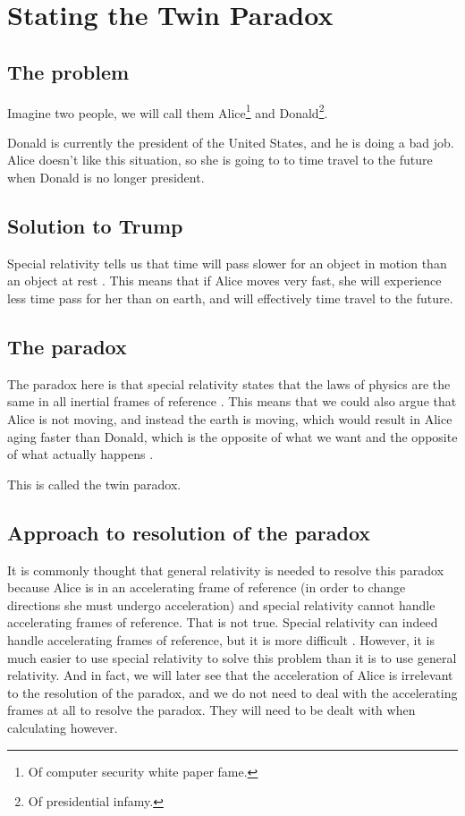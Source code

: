\chapter{Stating the Twin Paradox}
	\section{The problem}
		Imagine two people, we will call them Alice\footnote{Of computer security white paper fame.} and Donald\footnote{Of presidential infamy.}.

		Donald is currently the president of the United States, and he is doing a bad job.
		Alice doesn't like this situation, so she is going to to time travel to the future when Donald is no longer president.
	\section{Solution to Trump}
		Special relativity tells us that time will pass slower for an object in motion than an object at rest \autocites{textbook}{einstein1916}.
		This means that if Alice moves very fast, she will experience less time pass for her than on earth, and will effectively time travel to the future.
	\section{The paradox}
		The paradox here is that special relativity states that the laws of physics are the same in all inertial frames of reference \autocites{textbook}{einstein1916}.
		This means that we could also argue that Alice is not moving, and instead the earth is moving, which would result in Alice aging faster than Donald, which is the opposite of what we want and the opposite of what actually happens \autocite[\ppno~593--594]{textbook}.

		This is called the twin paradox.
	\section{Approach to resolution of the paradox}
		It is commonly thought that general relativity is needed to resolve this paradox because Alice is in an accelerating frame of reference (in order to change directions she must undergo acceleration) and special relativity cannot handle accelerating frames of reference.
		That is not true.
		Special relativity can indeed handle accelerating frames of reference, but it is more difficult \autocites{sracceleration}{twinparadox}.
		However, it is much easier to use special relativity to solve this problem than it is to use general relativity.
		And in fact, we will later see that the acceleration of Alice is irrelevant to the resolution of the paradox, and we do not need to deal with the accelerating frames at all to resolve the paradox.
		They will need to be dealt with when calculating however.

